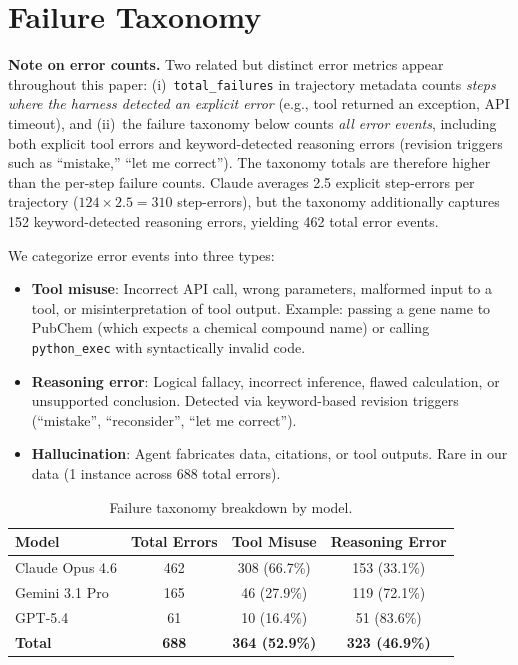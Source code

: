 \documentclass{article}
\begin{document}
\section{Failure Taxonomy}
\label{app:failure}

\textbf{Note on error counts.} Two related but distinct error metrics appear throughout this paper: (i)~\texttt{total\_failures} in trajectory metadata counts \emph{steps where the harness detected an explicit error} (e.g., tool returned an exception, API timeout), and (ii)~the failure taxonomy below counts \emph{all error events}, including both explicit tool errors and keyword-detected reasoning errors (revision triggers such as ``mistake,'' ``let me correct''). The taxonomy totals are therefore higher than the per-step failure counts. Claude averages 2.5 explicit step-errors per trajectory ($124 \times 2.5 = 310$ step-errors), but the taxonomy additionally captures 152 keyword-detected reasoning errors, yielding 462 total error events.

We categorize error events into three types:

\begin{itemize}
\item \textbf{Tool misuse}: Incorrect API call, wrong parameters, malformed input to a tool, or misinterpretation of tool output. Example: passing a gene name to PubChem (which expects a chemical compound name) or calling \texttt{python\_exec} with syntactically invalid code.
\item \textbf{Reasoning error}: Logical fallacy, incorrect inference, flawed calculation, or unsupported conclusion. Detected via keyword-based revision triggers (``mistake'', ``reconsider'', ``let me correct'').
\item \textbf{Hallucination}: Agent fabricates data, citations, or tool outputs. Rare in our data (1 instance across 688 total errors).
\end{itemize}

\begin{table}[h]
\caption{Failure taxonomy breakdown by model.}
\label{tab:failure_taxonomy}
\centering\small
\begin{tabular}{lccc}
\toprule
\textbf{Model} & \textbf{Total Errors} & \textbf{Tool Misuse} & \textbf{Reasoning Error} \\
\midrule
Claude Opus 4.6 & 462 & 308 (66.7\%) & 153 (33.1\%) \\
Gemini 3.1 Pro & 165 & 46 (27.9\%) & 119 (72.1\%) \\
GPT-5.4 & 61 & 10 (16.4\%) & 51 (83.6\%) \\
\midrule
\textbf{Total} & \textbf{688} & \textbf{364 (52.9\%)} & \textbf{323 (46.9\%)} \\
\bottomrule
\end{tabular}
\end{table}
\end{document}

